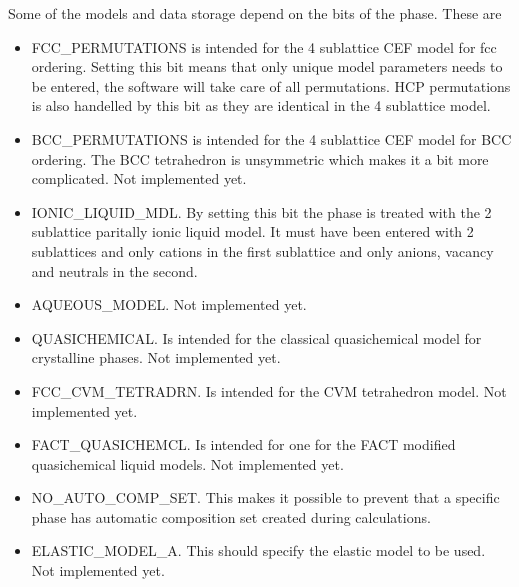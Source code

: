 \documentclass[12pt]{article}
\begin{document}
Some of the models and data storage depend on the bits of the phase.
These are

\begin{itemize}
\item FCC\_PERMUTATIONS is intended for the 4 sublattice CEF model for
fcc ordering.  Setting this bit means that only unique model
parameters needs to be entered, the software will take care of all
permutations.  HCP permutations is also handelled by this bit as they
are identical in the 4 sublattice model.

\item BCC\_PERMUTATIONS is intended for the 4 sublattice CEF model for
BCC ordering.  The BCC tetrahedron is unsymmetric which makes it a bit
more complicated.  Not implemented yet.

\item IONIC\_LIQUID\_MDL.  By setting this bit the phase is treated
with the 2 sublattice paritally ionic liquid model.  It must have been
entered with 2 sublattices and only cations in the first sublattice
and only anions, vacancy and neutrals in the second.

\item AQUEOUS\_MODEL. Not implemented yet.

\item QUASICHEMICAL. Is intended for the classical quasichemical
model for crystalline phases.  Not implemented yet.

\item FCC\_CVM\_TETRADRN.  Is intended for the CVM tetrahedron model.
Not implemented yet.

\item FACT\_QUASICHEMCL.  Is intended for one for the FACT modified
quasichemical liquid models.  Not implemented yet.

\item NO\_AUTO\_COMP\_SET.  This makes it possible to prevent that a
specific phase has automatic composition set created during
calculations.

\item ELASTIC\_MODEL\_A.  This should specify the elastic model to be
used.  Not implemented yet.
\end{itemize}
\end{document}

